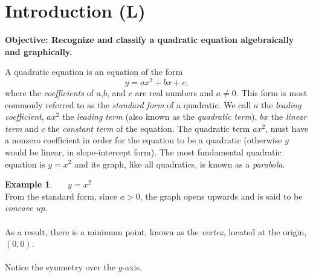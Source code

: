 \documentclass[12pt]{book}
\theoremstyle{definition}
\newtheorem{example}{Example}
\begin{document}
\section{Introduction (L)}
%
{\bf Objective: Recognize and classify a quadratic equation algebraically and graphically.}\par
A quadratic equation is an equation of the form $$y=ax^2+bx+c,$$ where the {\it coefficients} of $a$,$b$, and $c$ are real numbers and $a\neq 0$. This form is most commonly referred to as the {\it standard form} of a quadratic.  We call $a$ the {\it leading coefficient}, $ax^2$ the {\it leading term} (also known as the {\it quadratic term}), $bx$ the {\it linear term} and $c$ the {\it constant term} of the equation.  The quadratic term $ax^2$, must have a nonzero coefficient in order for the equation to be a quadratic (otherwise $y$ would be linear, in slope-intercept form). The most fundamental quadratic equation is $y=x^2$ and its graph, like all quadratics, is known as a {\it parabola}.  
\begin{multicols}{2}
\begin{example}~~~$y=x^2$\\

 From the standard form, since $a>0$, the graph opens upwards and is said to be \textit{concave up}.\\ \\
 As a result, there is a minimum point, known as the \textit{vertex}, located at the origin, $(0,0)$. \\  \\
 Notice the symmetry over the $y$-axis.

\columnbreak

\begin{center}
\end{center}
\end{example} 
\end{multicols}
\end{document}
